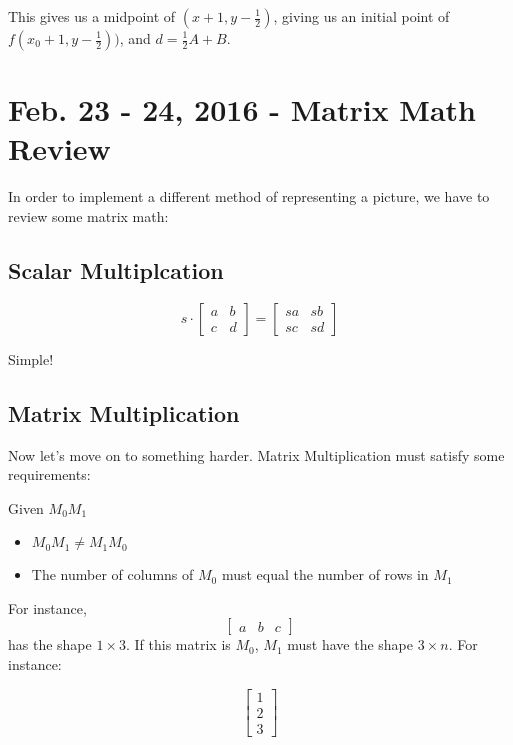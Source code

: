 \documentclass[11pt,fleqn]{article}
\theoremstyle{definition}
\begin{document}
This gives us a midpoint of $(x + 1, y - \frac{1}{2})$, giving us an initial point of
$f(x_0 + 1, y - \frac{1}{2}))$, and $d = \frac{1}{2}A + B$.

\section{Feb. 23 - 24, 2016 - Matrix Math Review}

In order to implement a different method of representing a picture, we have to review
some matrix math:

\subsection{Scalar Multiplcation}

\[
    s \cdot
    \begin{bmatrix}
        a & b \\
        c & d
    \end{bmatrix}
    =
    \begin{bmatrix}
        sa & sb \\
        sc & sd
    \end{bmatrix}
\]

Simple!

\subsection{Matrix Multiplication}

Now let's move on to something harder. Matrix Multiplication must satisfy some
requirements:

Given $M_0 M_1$
\begin{itemize}
    \item $M_0 M_1 \neq M_1 M_0$
    \item The number of columns of $M_0$ must equal the number of rows in $M_1$
\end{itemize}

For instance,
\[
    \begin{bmatrix}
        a & b & c
    \end{bmatrix}
\]
has the shape $1 \times 3$. If this matrix is $M_0$, $M_1$ must have the shape $3
\times n$. For instance:

\[
    \begin{bmatrix}
        1 \\
        2 \\
        3
    \end{bmatrix}
\]
\end{document}
